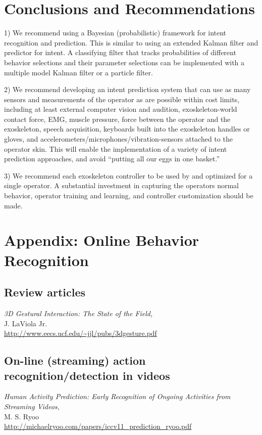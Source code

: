 \documentclass[letterpaper,12pt,fullpage]{article}
\begin{document}
\section{Conclusions and Recommendations}

1) We recommend using a Bayesian (probabilistic) framework for intent recognition
and prediction. This is similar to using an extended
Kalman filter and predictor for intent.
A classifying filter that tracks probabilities of different behavior selections
and their parameter selections can be implemented with a multiple model Kalman
filter or a particle filter.

2) We recommend developing an intent prediction system that can use
as many sensors and measurements of the operator as are possible within cost limits,
including at least external computer vision and audition, exoskeleton-world contact
force,
EMG, muscle pressure, force between the operator and the
exoskeleton,
speech acquisition, keyboards built into the exoskeleton handles or gloves,
and accelerometers/microphones/vibration-sensors attached to the operator skin.
This will enable the implementation of a variety of intent prediction approaches,
and avoid ``putting all our eggs in one basket.''

3) We recommend each exoskeleton controller
to be used by and optimized for a single operator.
A substantial investment in capturing the operators normal behavior,
operator training and learning, and controller customization should be made.

\section{Appendix: Online Behavior Recognition}

\subsection{Review articles}

{\it 3D Gestural Interaction: The State of the Field,}\\
J. LaViola Jr.\\
\url{http://www.eecs.ucf.edu/~jjl/pubs/3dgesture.pdf}

\subsection{On-line (streaming) action recognition/detection in videos}

{\it Human Activity Prediction: Early Recognition of Ongoing Activities
from Streaming Videos,}\\
M. S. Ryoo\\
\url{http://michaelryoo.com/papers/iccv11_prediction_ryoo.pdf}
\end{document}
